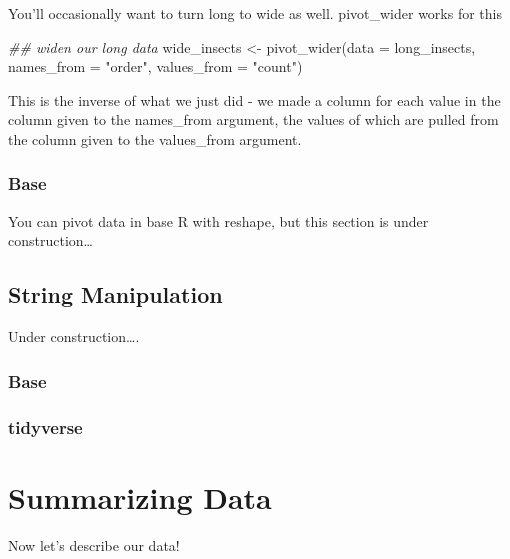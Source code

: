 \documentclass[
  letterpaper,
  DIV=11,
  numbers=noendperiod]{scrreprt}
\newenvironment{Shaded}{\begin{snugshade}}{\end{snugshade}}
\newcommand{\AttributeTok}[1]{\textcolor[rgb]{0.40,0.45,0.13}{#1}}
\newcommand{\DocumentationTok}[1]{\textcolor[rgb]{0.37,0.37,0.37}{\textit{#1}}}
\newcommand{\FunctionTok}[1]{\textcolor[rgb]{0.28,0.35,0.67}{#1}}
\newcommand{\NormalTok}[1]{\textcolor[rgb]{0.00,0.23,0.31}{#1}}
\newcommand{\OtherTok}[1]{\textcolor[rgb]{0.00,0.23,0.31}{#1}}
\newcommand{\StringTok}[1]{\textcolor[rgb]{0.13,0.47,0.30}{#1}}
\begin{document}
You'll occasionally want to turn long to wide as well. pivot\_wider
works for this

\begin{Shaded}
\begin{Highlighting}[]
\DocumentationTok{\#\# widen our long data}
\NormalTok{wide\_insects }\OtherTok{\textless{}{-}} \FunctionTok{pivot\_wider}\NormalTok{(}\AttributeTok{data =}\NormalTok{ long\_insects,}
                            \AttributeTok{names\_from =} \StringTok{"order"}\NormalTok{,}
                            \AttributeTok{values\_from =} \StringTok{"count"}\NormalTok{)}
\end{Highlighting}
\end{Shaded}

This is the inverse of what we just did - we made a column for each
value in the column given to the names\_from argument, the values of
which are pulled from the column given to the values\_from argument.

\hypertarget{base-1}{%
\subsection{Base}\label{base-1}}

You can pivot data in base R with reshape, but this section is under
construction\ldots{}

\hypertarget{string-manipulation}{%
\section{String Manipulation}\label{string-manipulation}}

Under construction\ldots.

\hypertarget{base-2}{%
\subsection{Base}\label{base-2}}

\hypertarget{tidyverse-1}{%
\subsection{tidyverse}\label{tidyverse-1}}

\hypertarget{summarizing-data}{%
\chapter{Summarizing Data}\label{summarizing-data}}

Now let's describe our data!
\end{document}

